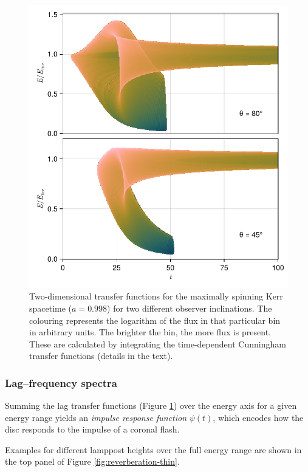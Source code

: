 \documentclass[fleqn,usenatbib]{mnras}
\begin{document}
\begin{figure}
    \centering
    \includegraphics[width=0.97\columnwidth]{figures/transfer-functions.2d.pdf}
    \caption{Two-dimensional transfer functions for the maximally spinning Kerr
        spacetime ($a = 0.998$) for two different observer inclinations. The
        colouring represents the logarithm of the flux in that particular bin in
        arbitrary units. The brighter the bin, the more flux is present. These
        are calculated by integrating the time-dependent Cunningham transfer
        functions
    (details in the text).}
    \label{fig:lag-frequency-transfer-functions}
\end{figure}

\subsubsection{Lag--frequency spectra}

Summing the lag transfer functions (Figure
\ref{fig:lag-frequency-transfer-functions}) over the energy axis for a given
energy range yields an \textit{impulse response function} $\psi(t)$, which
encodes how the disc responds to the impulse of a coronal flash.

Examples for different lamppost heights over the full energy range are shown in
the top panel of Figure
\ref{fig:reverberation-thin}.
\end{document}
